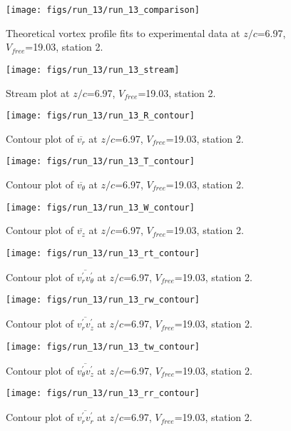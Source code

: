 \begin{figure}[H]
\centering
\texttt{[image: figs/run\_13/run\_13\_comparison]}
\caption{Theoretical vortex profile fits to experimental data at $z/c$=6.97, $V_{free}$=19.03, station 2.}
\end{figure}


\begin{figure}[H]
\centering
\texttt{[image: figs/run\_13/run\_13\_stream]}
\caption{Stream plot at $z/c$=6.97, $V_{free}$=19.03, station 2.}
\end{figure}


\begin{figure}[H]
\centering
\texttt{[image: figs/run\_13/run\_13\_R\_contour]}
\caption{Contour plot of $\overline{v_{r}}$ at $z/c$=6.97, $V_{free}$=19.03, station 2.}
\end{figure}


\begin{figure}[H]
\centering
\texttt{[image: figs/run\_13/run\_13\_T\_contour]}
\caption{Contour plot of $\overline{v_{\theta}}$ at $z/c$=6.97, $V_{free}$=19.03, station 2.}
\end{figure}


\begin{figure}[H]
\centering
\texttt{[image: figs/run\_13/run\_13\_W\_contour]}
\caption{Contour plot of $\overline{v_{z}}$ at $z/c$=6.97, $V_{free}$=19.03, station 2.}
\end{figure}


\begin{figure}[H]
\centering
\texttt{[image: figs/run\_13/run\_13\_rt\_contour]}
\caption{Contour plot of $\overline{v_{r}^{\prime} v_{\theta}^{\prime}}$ at $z/c$=6.97, $V_{free}$=19.03, station 2.}
\end{figure}


\begin{figure}[H]
\centering
\texttt{[image: figs/run\_13/run\_13\_rw\_contour]}
\caption{Contour plot of $\overline{v_{r}^{\prime} v_{z}^{\prime}}$ at $z/c$=6.97, $V_{free}$=19.03, station 2.}
\end{figure}


\begin{figure}[H]
\centering
\texttt{[image: figs/run\_13/run\_13\_tw\_contour]}
\caption{Contour plot of $\overline{v_{\theta}^{\prime} v_{z}^{\prime}}$ at $z/c$=6.97, $V_{free}$=19.03, station 2.}
\end{figure}


\begin{figure}[H]
\centering
\texttt{[image: figs/run\_13/run\_13\_rr\_contour]}
\caption{Contour plot of $\overline{v_{r}^{\prime} v_{r}^{\prime}}$ at $z/c$=6.97, $V_{free}$=19.03, station 2.}
\end{figure}


